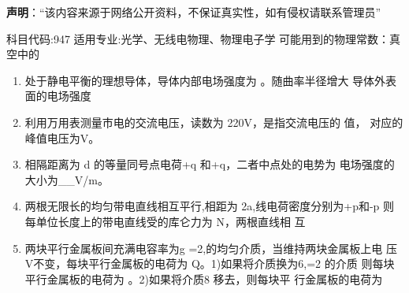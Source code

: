 
\textbf{声明}：“该内容来源于网络公开资料，不保证真实性，如有侵权请联系管理员”


科目代码:947
适用专业:光学、无线电物理、物理电子学
可能用到的物理常数：真空中的
\begin{enumerate}
\item  处于静电平衡的理想导体，导体内部电场强度为
。随曲率半径增大
导体外表面的电场强度
\item 利用万用表测量市电的交流电压，读数为 220V，是指交流电压的
值，
对应的峰值电压为V。
\item 相隔距离为 d 的等量同号点电荷+q 和+q，二者中点处的电势为
电场强度的大小为__V/m。
\item 两根无限长的均匀带电直线相互平行,相距为 2a,线电荷密度分别为+p和-p
则每单位长度上的带电直线受的库仑力为
N，两根直线相
互
\item 两块平行金属板间充满电容率为g =2,的均匀介质，当维持两块金属板上电
压V不变，每块平行金属板的电荷为 Q。1)如果将介质换为6,=2 的介质
则每块平行金属板的电荷为
。2)如果将介质8 移去，则每块平
行金属板的电荷为
\end{enumerate}